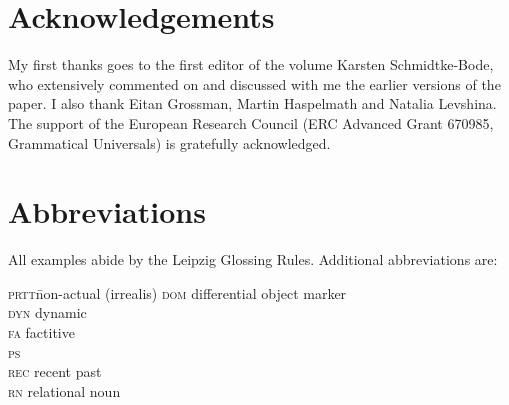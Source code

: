 \documentclass[output=paper]{langsci/langscibook}
\begin{document}
\newpage

\section*{Acknowledgements} 

My first thanks goes to the first editor of the volume Karsten Schmidtke-Bode, who extensively commented on and discussed with me the earlier versions of the paper. I also thank Eitan Grossman, Martin Haspelmath and Natalia Levshina. The support of the European Research Council (ERC Advanced Grant 670985, Grammatical Universals) is gratefully acknowledged.

\section*{Abbreviations} 

All examples abide by the Leipzig Glossing Rules. Additional abbreviations are: 

\begin{multicols}{2}
\begin{tabbing}
\textsc{prtt}\hspace{5mm}\=non-actual (irrealis) \hspace{5mm}\kill
\textsc{dom}  \>  differential object marker                 \\
\textsc{dyn} \> dynamic                          \\
\textsc{fa}   \>  factitive                  \\
\textsc{ps} \>   \\
\textsc{rec} \>  recent past \\
\textsc{rn} \>  relational noun \\
\end{tabbing}
\end{multicols}

\sloppy
\printbibliography[heading=subbibliography,notkeyword=this] 
\end{document}
